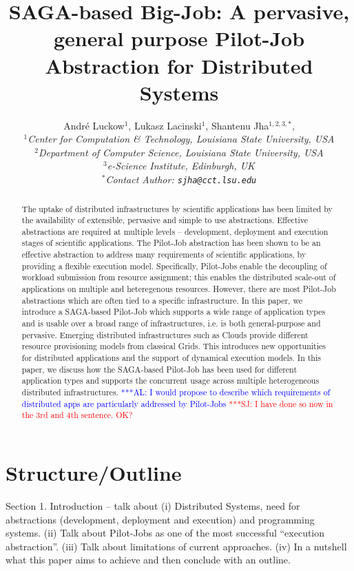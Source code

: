 \documentclass[conference,final]{IEEEtran}
\title{SAGA-based Big-Job: A pervasive, general purpose Pilot-Job Abstraction for Distributed Systems}
\author{
Andr\'e Luckow$^{1}$, Lukasz Lacinski$^{1}$,   Shantenu Jha$^{1,2,3,*}$,\\
  \small{\emph{$^{1}$Center for Computation \& Technology, Louisiana State University, USA}}\\
  \small{\emph{$^{2}$Department of Computer Science, Louisiana State University, USA}}\\
  \small{\emph{$^{3}$e-Science Institute, Edinburgh, UK}}\\
  \small{\emph{$^{*}$Contact Author: \texttt{sjha@cct.lsu.edu}}}\\
}
\newcommand{\up}{\vspace*{-1em}}
\newcommand{\alnote}[1]{ {\textcolor{blue} { ***AL: #1 }}}
\newcommand{\jhanote}[1]{ {\textcolor{red} { ***SJ: #1 }}}
\newcommand{\alnote}[1]{}
\newcommand{\jhanote}[1]{}
\begin{document}
 

\maketitle    


\begin{abstract}
  The uptake of distributed infrastructures by scientific applications
  has been limited by the availability of extensible, pervasive and
  simple to use abstractions. Effective abstractions are required at
  multiple levels -- development, deployment and execution stages of
  scientific applications. The Pilot-Job abstraction has been shown to
  be an effective abstraction to address many requirements of
  scientific applications, by providing a flexible execution model.
  Specifically, Pilot-Jobs enable the decoupling of workload
  submission from resource assignment; this enables the distributed
  scale-out of applications on multiple and heteregenous resources.
  However, there are most Pilot-Job abstractions which are often
  tied to a specific infrastructure.  In this paper, we introduce a
  SAGA-based Pilot-Job which supports a wide range of application
  types and is usable over a broad range of infrastructures, i.e. is
  both general-purpose and pervasive.  Emerging distributed
  infrastructures such as Clouds provide different resource
  provisioning models from classical Grids. This introduces new
  opportunities for distributed applications and the support of
  dynamical execution models. In this paper, we discuss how the
  SAGA-based Pilot-Job has been used for different application types
  and supports the concurrent usage across multiple heterogeneous
  distributed infrastructures.  \alnote{I would propose to describe
    which requirements of distributed apps are particularly addressed
    by Pilot-Jobs}\jhanote{I have done so now in the 3rd and 4th
    sentence. OK?}
\end{abstract}


\section*{Structure/Outline}

Section 1. Introduction -- talk about (i) Distributed Systems, need
for abstractions (development, deployment and execution) and
programming systems. (ii) Talk about Pilot-Jobs as one of the most
successful ``execution abstraction''. (iii) Talk about limitations of
current approaches. (iv) In a nutshell what this paper aims to achieve
and then conclude with an outline.
\end{document}
